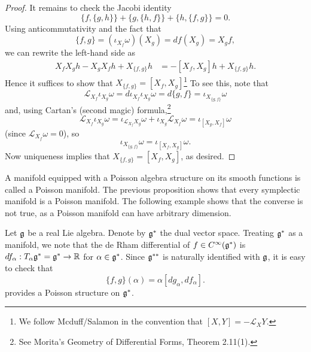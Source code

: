 \documentclass{amsart}
\begin{document}
\begin{proof}
    It remains to check the Jacobi identity
    \begin{equation*}
        \{f,\{g,h\}\} + \{g,\{h,f\}\} + \{h,\{f,g\}\} = 0.
    \end{equation*}
    Using anticommutativity and the fact that
    \begin{equation*}
        \{f,g\}=(\iota_{X_f}\omega)(X_g)=df(X_g)=X_g f,
    \end{equation*}
    we can rewrite the left-hand side as
    \begin{align*}
        X_fX_gh-X_gX_fh+X_{\{f,g\}}h &= -[X_f,X_g]h+X_{\{f,g\}}h.
    \end{align*}
    Hence it suffices to show that $X_{\{f,g\}}=[X_f,X_g]$\footnote{We follow Mcduff/Salamon in the
        convention that $[X,Y]=-\mathcal{L}_XY$.}
    To see this, note that
    \begin{equation*}
        \mathcal{L}_{X_f}\iota_{X_g}\omega = d\iota_{X_f}\iota_{X_g}\omega=d\{g,f\}=\iota_{X_{\{g,f\}}}\omega
    \end{equation*}
    and, using Cartan's (second magic) formula,\footnote{See Morita's Geometry of Differential Forms, Theorem 2.11(1).}
    \begin{equation*}
        \mathcal{L}_{X_f}\iota_{X_g}\omega=\iota_{\mathcal{L}_{X_f}X_g}\omega+\iota_{X_g}\mathcal{L}_{X_f}\omega=\iota_{[X_g,X_f]}\omega
    \end{equation*}
    (since $\mathcal{L}_{X_f}\omega=0$), so
    \begin{equation*}
        \iota_{X_{\{g,f\}}}\omega=\iota_{[X_f,X_g]}\omega.
    \end{equation*}
    Now uniqueness implies that $X_{\{f,g\}}=[X_f,X_g]$, as desired.
\end{proof}

A manifold equipped with a Poisson algebra structure on its smooth functions is called a
Poisson manifold. The previous proposition shows that every symplectic manifold is a Poisson
manifold. The following example shows that the converse is not true, as a Poisson manifold
can have arbitrary dimension.

\begin{example}
    Let $\mathfrak g$ be a real Lie algebra. Denote by $\mathfrak g^*$ the dual vector space. Treating
    $\mathfrak g^*$ as a manifold, we note that the de Rham differential of $f\in C^\infty(\mathfrak g^*)$
    is $df_\alpha:T_\alpha\mathfrak g^*=\mathfrak g^*\to\mathbb{R}$ for $\alpha\in\mathfrak g^*$. Since $\mathfrak g^{**}$ is
    naturally identified with $\mathfrak g$, it is easy to check that
    \begin{equation*}
        \{f,g\}(\alpha) = \alpha[dg_\alpha,df_\alpha].
    \end{equation*}
    provides a Poisson structure on $\mathfrak g^*$.
\end{example}
\end{document}
